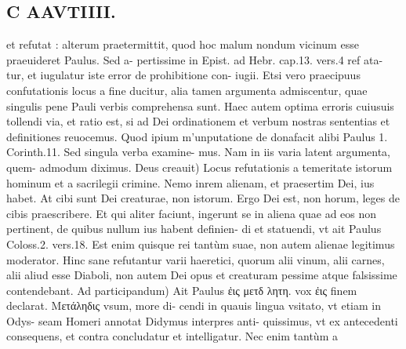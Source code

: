 \documentclass{article}
\begin{document}
\begin{pages}
\section*{C AAVTIIII. }
\marginpar{[ p.187 ]}\pstart et refutat : alterum praetermittit, quod hoc malum nondum vicinum esse praeuideret Paulus. Sed a- pertissime in Epist. ad Hebr. cap.13. vers.4 ref ata- tur, et iugulatur iste error de prohibitione con- iugii. Etsi vero praecipuus confutationis locus a fine ducitur, alia tamen argumenta admiscentur, quae singulis pene Pauli verbis comprehensa sunt. Haec autem optima erroris cuiusuis tollendi via, et ratio est, si ad Dei ordinationem et verbum nostras sententias et definitiones reuocemus. Quod ipium m'unputatione de donafacit alibi Paulus 1. Corinth.11. Sed singula verba examine- mus. Nam in iis varia latent argumenta, quem- admodum diximus.  \pend\pstart Deus creauit) Locus refutationis a temeritate istorum hominum et a sacrilegii crimine. Nemo inrem alienam, et praesertim Dei, ius habet. At cibi sunt Dei creaturae, non istorum. Ergo Dei est, non horum, leges de cibis praescribere. Et qui aliter faciunt, ingerunt se in aliena quae ad eos non pertinent, de quibus nullum ius habent definien- di et statuendi, vt ait Paulus Coloss.2. vers.18. Est enim quisque rei tantùm suae, non autem alienae legitimus moderator. Hinc sane refutantur varii haeretici, quorum alii vinum, alii carnes, alii aliud esse Diaboli, non autem Dei opus et creaturam pessime atque falsissime contendebant.  \pend\pstart Ad participandum) Ait Paulus ἐις μετδ λητη. vox ἐις finem declarat. Μετάληδις vsum, more di- cendi in quauis lingua vsitato, vt etiam in Odys- seam Homeri annotat Didymus interpres anti- quissimus, vt ex antecedenti consequens, et contra concludatur et intelligatur. Nec enim tantùm a  \pend

\end{pages}
\end{document}
